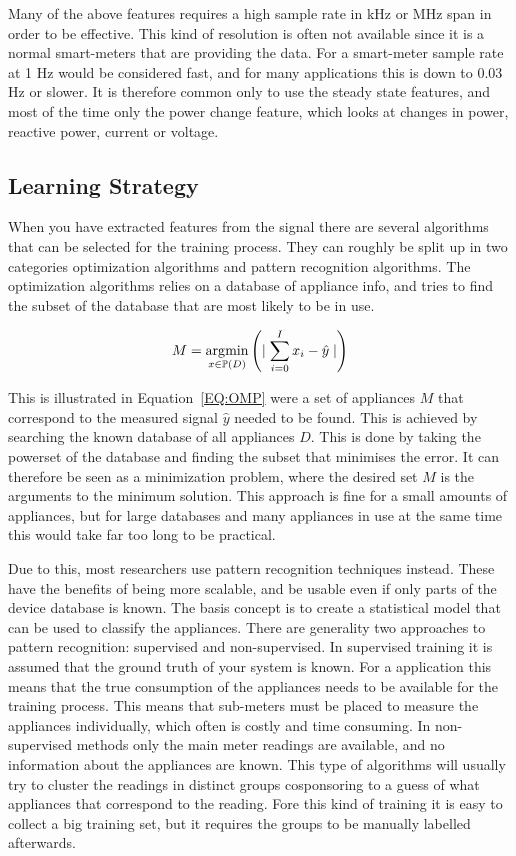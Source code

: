 Many of the above features requires a high sample rate in kHz or MHz span in order to be effective. This kind of resolution is often not available since it is a normal smart-meters that are providing the data. For a smart-meter sample rate at 1 Hz would be considered fast, and for many applications this is down to $0.03$ Hz or slower. It is therefore common only to use the steady state features, and most of the time only the power change feature, which looks at changes in power, reactive power, current or voltage. 

\subsection{Learning Strategy} 
When you have extracted features from the signal there are several algorithms that can be selected for the training process. They can roughly be split up in two categories optimization algorithms and pattern recognition algorithms. The optimization algorithms relies on a database of appliance info, and tries to find the subset of the database that are most likely to be in use. 

\begin{equation}
	M = \operatorname*{\arg\!\min}_{x \in \mathbb{P}(D) } \left( \mid {\sum_{i = 0}^{I} x_i - \hat{y}  \mid} \right)
	\label{EQ:OMP}
\end{equation}

This is illustrated in Equation~\ref{EQ:OMP} were a set of appliances $M$ that correspond to the measured signal $\hat{y}$ needed to be found. This is achieved by searching the known database of all appliances $D$. This is done by taking the powerset of the database and finding the subset that minimises the error. It can therefore be seen as a minimization problem, where the desired set $M$ is the arguments to the minimum solution. This approach is fine for a small amounts of appliances, but for large databases and many appliances in use at the same time this would take far too long to be practical. 

Due to this, most researchers use pattern recognition techniques instead. These have the benefits of being more scalable, and be usable even if only parts of the device database is known. The basis concept is to create a statistical model that can be used to classify the appliances. There are generality two approaches to pattern recognition: supervised and non-supervised. In supervised training it is assumed that the ground truth of your system is known. For a  application this means that the true consumption of the appliances needs to be available for the training process. This means that sub-meters must be placed to measure the appliances individually, which often is costly and time consuming. In non-supervised methods only the main meter readings are available, and no information about the appliances are known. This type of algorithms will usually try to cluster the readings in distinct groups cosponsoring to a guess of what appliances that correspond to the reading. Fore this kind of training it is easy to collect a big training set, but it requires the groups to be manually labelled afterwards.  
  
